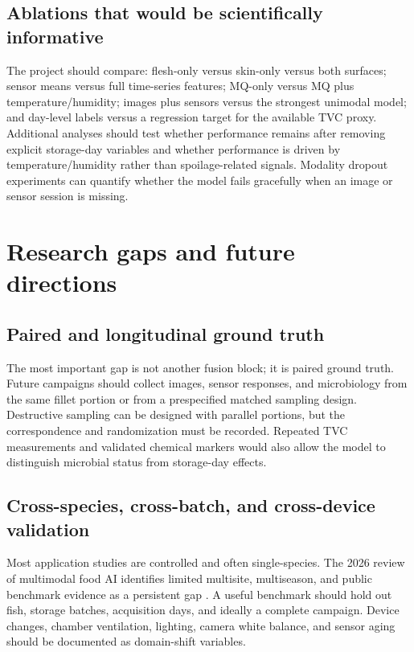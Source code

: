 \documentclass[11pt]{article}
\begin{document}
\subsection{Ablations that would be scientifically informative}

The project should compare: flesh-only versus skin-only versus both surfaces; sensor means versus full time-series features; MQ-only versus MQ plus temperature/humidity; images plus sensors versus the strongest unimodal model; and day-level labels versus a regression target for the available TVC proxy. Additional analyses should test whether performance remains after removing explicit storage-day variables and whether performance is driven by temperature/humidity rather than spoilage-related signals. Modality dropout experiments can quantify whether the model fails gracefully when an image or sensor session is missing.

\section{Research gaps and future directions}

\subsection{Paired and longitudinal ground truth}

The most important gap is not another fusion block; it is paired ground truth. Future campaigns should collect images, sensor responses, and microbiology from the same fillet portion or from a prespecified matched sampling design. Destructive sampling can be designed with parallel portions, but the correspondence and randomization must be recorded. Repeated TVC measurements and validated chemical markers would also allow the model to distinguish microbial status from storage-day effects.

\subsection{Cross-species, cross-batch, and cross-device validation}

Most application studies are controlled and often single-species. The 2026 review of multimodal food AI identifies limited multisite, multiseason, and public benchmark evidence as a persistent gap \citep{Chen2026multimodal}. A useful benchmark should hold out fish, storage batches, acquisition days, and ideally a complete campaign. Device changes, chamber ventilation, lighting, camera white balance, and sensor aging should be documented as domain-shift variables.
\end{document}
